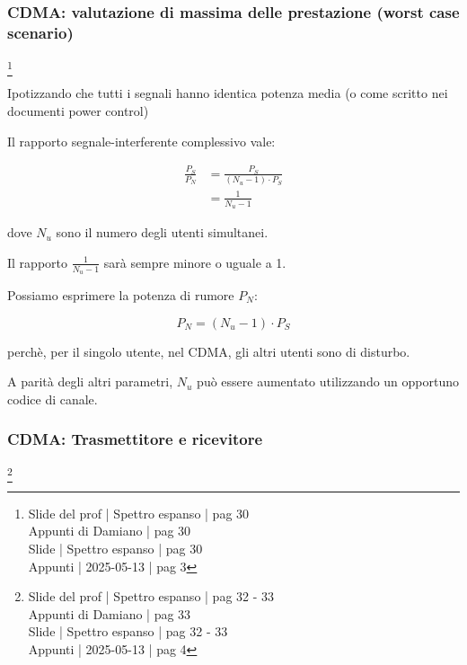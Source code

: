 \newpage 

\subsubsection{CDMA: valutazione di massima delle prestazione (worst case scenario)}
\footnote{Slide del prof | Spettro espanso | pag 30 \\
Appunti di Damiano | pag 30 \\
Slide | Spettro espanso | pag 30 \\
Appunti | 2025-05-13 | pag 3 
} 

Ipotizzando che tutti i segnali hanno identica potenza media (o come scritto nei documenti power control)

Il rapporto segnale-interferente complessivo vale: 

{
    \Large 
    \begin{equation}
        \begin{split}
        \frac{P_S}{P_N}
        &= 
        \frac{P_S}{(N_u - 1) \cdot P_S}
        \\
        &=
        \frac{1}{N_u - 1}
        \end{split}
    \end{equation}
}

dove $N_u$ sono il numero degli utenti simultanei. \newline 

Il rapporto $\frac{1}{N_u - 1}$ sarà sempre minore o uguale a 1. \newline 

Possiamo esprimere la potenza di rumore $P_N$: 

{
    \Large 
    \begin{equation}
        P_N = \left( N_u - 1\right) \cdot P_S
    \end{equation}
}

perchè, per il singolo utente, nel CDMA, gli altri utenti sono di disturbo. \newline 

A parità degli altri parametri, 
$N_u$ può essere aumentato utilizzando un opportuno codice di canale. \newline 

\newpage 

\subsubsection{CDMA: Trasmettitore e ricevitore}
\footnote{Slide del prof | Spettro espanso | pag 32 - 33 \\
Appunti di Damiano | pag 33 \\
Slide | Spettro espanso | pag 32 - 33\\
Appunti | 2025-05-13 | pag 4 
} 

